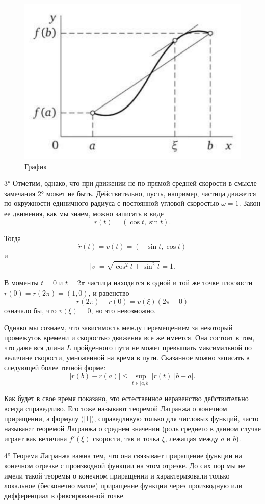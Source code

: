 \documentclass[14pt]{extreport}
\begin{document}
\begin{figure}[H]
\centerline{\includegraphics[width=0.5\linewidth]{Grafic}}
\caption{График}
\label{fig1} 
\end{figure}

 3° Отметим, однако, что при движении не по прямой средней скорости в смысле замечания 2° может не быть. Действительно, пусть, например, частица движется по окружности единичного радиуса с постоянной угловой скоростью $\omega=1$. Закон ее движения, как мы знаем, можно записать в виде
\[ r(t)=(\cos{t} ,\sin{t}). \]

Тогда
\[\dot{r}(t)=v(t)=(-\sin{t},\cos{t}) \]
и
\[\left|v \right|=\sqrt{\cos^2{t} + \sin^2{t}}=1.
\]

В моменты $t =0$ и $t =2\pi$ частица находится в одной и той же точке плоскости $r(0)=r(2\pi)=(1, 0)$, и равенство
\[ r(2\pi)- r(0) = v(\xi)(2\pi-0) \]
означало бы, что $v(\xi)=0$, но это невозможно.

Однако мы сознаем, что зависимость между перемещением за некоторый промежуток времени и скоростью движения все же имеется. Она состоит в том, что даже вся длина $L$ пройденного пути не может превышать максимальной по величине скорости, умноженной на время в пути. Сказанное можно записать в следующей более точной форме:
\[\left|r(b)- r(a)\right|\leq\underset{t\in]a,b[}{\sup}\left|\dot{r}(t)\right|\left|b - a\right|.\]

Как будет в свое время показано, это естественное неравенство действительно всегда справедливо. Его тоже называют теоремой Лагранжа о конечном приращении, а формулу (\ref {1}), справедливую только для числовых функций, часто называют теоремой Лагранжа о среднем значении (роль среднего в данном случае играет как величина $f'(\xi)$ скорости, так и точка $\xi$, лежащая между $a$ и $b$).

4° Теорема Лагранжа важна тем, что она связывает приращение функции на конечном отрезке с производной функции на этом отрезке. До сих пор мы не имели такой теоремы о конечном приращении и характеризовали только локальное (бесконечно малое) приращение функции через производную или дифференциал в фиксированной точке.
\end{document}
